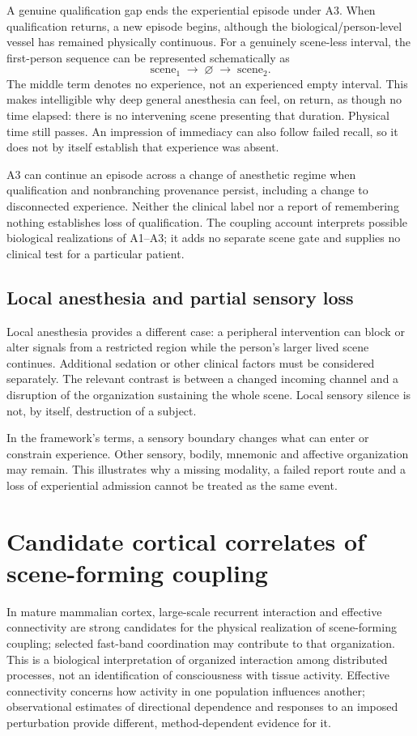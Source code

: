 A genuine qualification gap ends the experiential episode under A3. When qualification returns, a new episode begins, although the biological/person-level vessel has remained physically continuous. For a genuinely scene-less interval, the first-person sequence can be represented schematically as
\[
\text{scene}_1\;\longrightarrow\;\varnothing\;\longrightarrow\;\text{scene}_2.
\]
The middle term denotes no experience, not an experienced empty interval. This makes intelligible why deep general anesthesia can feel, on return, as though no time elapsed: there is no intervening scene presenting that duration. Physical time still passes. An impression of immediacy can also follow failed recall, so it does not by itself establish that experience was absent.

A3 can continue an episode across a change of anesthetic regime when qualification and nonbranching provenance persist, including a change to disconnected experience. Neither the clinical label nor a report of remembering nothing establishes loss of qualification. The coupling account interprets possible biological realizations of A1--A3; it adds no separate scene gate and supplies no clinical test for a particular patient.

\subsection{Local anesthesia and partial sensory loss}\label{sec:local-anesthesia}
Local anesthesia provides a different case: a peripheral intervention can block or alter signals from a restricted region while the person's larger lived scene continues. Additional sedation or other clinical factors must be considered separately. The relevant contrast is between a changed incoming channel and a disruption of the organization sustaining the whole scene. Local sensory silence is not, by itself, destruction of a subject.

In the framework's terms, a sensory boundary changes what can enter or constrain experience. Other sensory, bodily, mnemonic and affective organization may remain. This illustrates why a missing modality, a failed report route and a loss of experiential admission cannot be treated as the same event.


\section{Candidate cortical correlates of scene-forming coupling}\label{sec:cortical-correlates}
In mature mammalian cortex, large-scale recurrent interaction and effective connectivity are strong candidates for the physical realization of scene-forming coupling; selected fast-band coordination may contribute to that organization. This is a biological interpretation of organized interaction among distributed processes, not an identification of consciousness with tissue activity. Effective connectivity concerns how activity in one population influences another; observational estimates of directional dependence and responses to an imposed perturbation provide different, method-dependent evidence for it.

